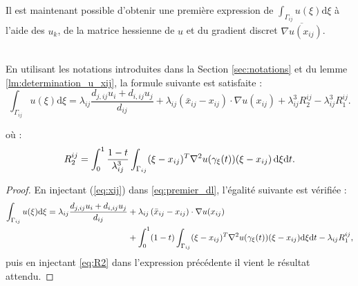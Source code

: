 \documentclass[12pt,a4paper]{article}
\begin{document}
	 Il est maintenant possible d'obtenir une première expression de $\displaystyle\int_{\Gamma_{ij}} u( \xi)\mathrm d \xi$ à l'aide des $u_k$, de la matrice hessienne de $u$ et du gradient discret $\overline{\nabla u(x_{ij})}$.
	 
	 \newpage
	 
	 \begin{lm}\label{lm:expression_int_u_xi}	$ $\\
	 	En utilisant les notations introduites dans la Section \ref{sec:notations} et du lemme \ref{lm:determination_u_xij}, la formule suivante est satisfaite :
 		\begin{equation}\label{eq:somme}
 			\displaystyle\int_{\Gamma_{ij}} u( \xi)\mathrm d \xi = \lambda_{ij}\dfrac{d_{j,ij}u_i + d_{i,ij}u_j}{d_{ij}} + \lambda_{ij}\left( {\bar x_{ij}-  x_{ij}}\right)\cdot {\nabla u}(  x_{ij}) + \lambda_{ij}^3R_2^{ij} - \lambda_{ij}^3R_1^{ij}.
 		\end{equation}
	 	
	 	\begin{minipage}{15.5cm}
	 	où :
	 	\begin{equation}\label{eq:R2}
	 		R_2^{ij} = \displaystyle\int_0^1 \dfrac{1-t}{\lambda_{ij}^3}\int_{\Gamma_{ij}} ( \xi-  x_{ij})^T\nabla^2 u(\gamma_{ \xi}(t)) ( \xi-  x_{ij})\,\mathrm d \xi \mathrm dt.
	 	\end{equation}
	 	
	 	\end{minipage}
	 \end{lm}

	\begin{proof} En injectant (\ref{eq:xij}) dans \eqref{eq:premier_dl}, l'égalité suivante est vérifiée :			
		\[
			\begin{aligned}
				\displaystyle\int_{\Gamma_{ij}} u( \xi)\mathrm d \xi = \lambda_{ij}\dfrac{d_{j,ij}u_i + d_{i,ij}u_j}{d_{ij}} &+ \lambda_{ij}\left( {\bar x_{ij}-  x_{ij}}\right)\cdot {\nabla u}(  x_{ij}) \\
				&+ \displaystyle\int_0^1 (1-t)\int_{\Gamma_{ij}} ( \xi-x_{ij})^T\nabla^2u(\gamma_{ \xi}(t)) ( \xi-  x_{ij})\mathrm d \xi \mathrm dt - \lambda_{ij}R_1^{ij},
			\end{aligned}
		\]
		puis en injectant \eqref{eq:R2} dans l'expression précédente il vient le résultat attendu.
		
	\end{proof}
	
	\vspace{-.5cm}
	
\end{document}
